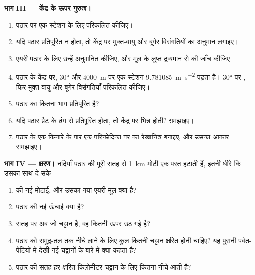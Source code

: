 \begin{problem}
\noindent\textbf{भाग III --- केंद्र के ऊपर गुरुत्व।}
\begin{enumerate}[resume]
  \item पठार पर एक स्टेशन के लिए  परिकलित कीजिए।
  \item यदि पठार प्रतिपूरित न होता, तो केंद्र पर मुक्त-वायु और बूगेर विसंगतियों का अनुमान लगाइए।
  \item एयरी पठार के लिए उन्हें अनुमानित कीजिए, और मूल के लुप्त द्रव्यमान से  की जाँच कीजिए।
  \item पठार के केंद्र पर, \ang{30}  और \qty{4000}{m} पर एक स्टेशन \qty{9.781085}{m.s^{-2}} पढ़ता है। \ang{30} पर , फिर मुक्त-वायु और बूगेर विसंगतियाँ परिकलित कीजिए।
  \item पठार का कितना भाग प्रतिपूरित है?
  \item यदि पठार प्रैट के ढंग से प्रतिपूरित होता, तो केंद्र पर  भिन्न होती? समझाइए।
  \item पठार के एक किनारे के पार एक परिच्छेदिका पर  का रेखाचित्र बनाइए, और उसका आकार समझाइए।
\end{enumerate}

\noindent\textbf{भाग IV --- क्षरण।}
नदियाँ पठार की पूरी सतह से \qty{1}{km} मोटी एक परत हटाती हैं, इतनी धीरे कि  उसका साथ दे सके।
\begin{enumerate}[resume]
  \item {} की नई मोटाई, और उसका नया एयरी मूल क्या है?
  \item पठार की नई ऊँचाई क्या है?
  \item सतह पर अब जो चट्टान है, वह कितनी ऊपर उठ गई है?
  \item पठार को समुद्र-तल तक नीचे लाने के लिए कुल कितनी चट्टान क्षरित होनी चाहिए? यह पुरानी पर्वत-पेटियों में देखी गई चट्टानों के बारे में क्या कहता है?
  \item पठार की सतह हर क्षरित किलोमीटर चट्टान के लिए कितना नीचे आती है?
\end{enumerate}
\end{problem}
